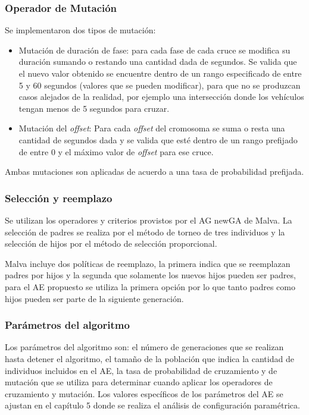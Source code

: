 \subsubsection{Operador de Mutación}
Se implementaron dos tipos de mutación:
\begin{itemize}
	
	\item Mutación de duración de fase: para cada fase de cada cruce se modifica su duración sumando o restando una cantidad dada de segundos. Se valida que el nuevo valor obtenido se encuentre dentro de un rango especificado de entre 5 y 60 segundos (valores que se pueden modificar), para que no se produzcan casos alejados de la realidad, por ejemplo una intersección donde los vehículos tengan menos de 5 segundos para cruzar.
	
	\item Mutación del \emph{offset}: Para cada \emph{offset} del cromosoma se suma o resta una cantidad de segundos dada y se valida que esté dentro de un rango prefijado de entre 0 y el máximo valor de \emph{offset} para ese cruce.
	

\end{itemize}
Ambas mutaciones son aplicadas de acuerdo a una tasa de probabilidad prefijada.

\subsubsection{Selección y reemplazo}
Se  utilizan los operadores y criterios provistos por el AG newGA de Malva. La selección de padres se realiza por el método de torneo de tres individuos y la selección de hijos por el método de selección proporcional. 

Malva incluye dos políticas de reemplazo, la primera indica que se reemplazan padres por hijos y la segunda que solamente los nuevos hijos pueden ser padres, para el AE propuesto se utiliza la primera opción por lo que tanto padres como hijos pueden ser parte de la siguiente generación.

\subsubsection{Parámetros del algoritmo}
Los parámetros del algoritmo son: el número de generaciones que se realizan hasta detener el algoritmo, el tamaño de la población que indica la cantidad de individuos incluidos en el AE, la tasa de probabilidad de cruzamiento y de mutación que se utiliza para determinar cuando aplicar los operadores de cruzamiento y mutación. Los valores específicos de los parámetros del AE se ajustan en el capítulo 5 donde se realiza el análisis de configuración paramétrica. 

